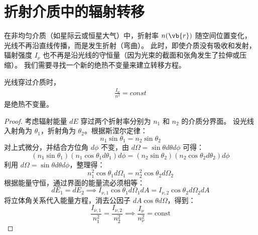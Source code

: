 \section{折射介质中的辐射转移}

在非均匀介质（如星际云或恒星大气）中，折射率 $n(\vb{r})$ 随空间位置变化，光线不再沿直线传播，而是发生折射（弯曲）。
此时，即使介质没有吸收和发射，辐射强度 $I_\nu$ 也不再是沿光线的守恒量（因为光束的截面和张角发生了拉伸或压缩）。
我们需要寻找一个新的绝热不变量来建立转移方程。

\begin{theorem}
    光线穿过介质时，
    \begin{align*}
        \frac{I_\nu}{n^2} = const
    \end{align*}
    是绝热不变量。
\end{theorem}
\begin{proof}
    考虑辐射能量 $dE$ 穿过两个折射率分别为 $n_1$ 和 $n_2$ 的介质分界面。
设光线入射角为 $\theta_1$，折射角为 $\theta_2$。根据斯涅尔定律：
\begin{equation}
    n_1 \sin\theta_1 = n_2 \sin\theta_2
\end{equation}
对上式微分，并结合方位角 $d\phi$ 不变，由 $d\Omega = \sin\theta d\theta d\phi$ 可得：
\[ (n_1 \sin\theta_1)(n_1 \cos\theta_1 d\theta_1) d\phi = (n_2 \sin\theta_2)(n_2 \cos\theta_2 d\theta_2) d\phi \]
    利用 $d\Omega = \sin\theta d\theta d\phi$，整理得：
    \begin{equation}
        n_1^2 \cos\theta_1 d\Omega_1 = n_2^2 \cos\theta_2 d\Omega_2
    \end{equation}
    根据能量守恒，通过界面的能量流必须相等：
\begin{equation}
    dE_1 = dE_2 \implies I_{\nu,1} \cos\theta_1 d\Omega_1 dA = I_{\nu,2} \cos\theta_2 d\Omega_2 dA
\end{equation}
将立体角关系代入能量方程，消去公因子 $dA \cos\theta d\Omega$，得到：
\begin{equation}
    \frac{I_{\nu,1}}{n_1^2} = \frac{I_{\nu,2}}{n_2^2} \implies \frac{I_\nu}{n_\nu^2} = \text{const}
    \label{eq:In}
\end{equation}
\end{proof}

